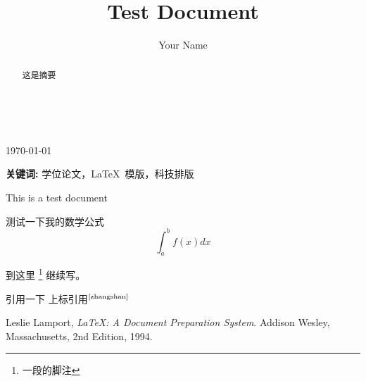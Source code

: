 \documentclass[a4paper,11pt,twoside,openany]{article}
\newcommand{\upcite}[1]{$^{\mbox{\scriptsize \cite{#1}}}$}%
\begin{document}
\tableofcontents
\thispagestyle{empty} 　　　%
\author{Your Name}
\title{Test Document}
\maketitle
\today %
\begin{abstract}
这是摘要
\end{abstract}
\vfill %
\textbf{关键词:} 学位论文，\LaTeX\ 模版，科技排版


This is a test document
\newline %

测试一下我的数学公式\[\int_a^b f(x)dx\]

到这里
\footnote{一段的脚注}
继续写。
\par
引用一下\cite{zhangshan}
上标引用\upcite{zhangshan}
\par

\begin{thebibliography}{9}
Leslie Lamport,
\emph{\LaTeX: A Document Preparation System}.
Addison Wesley, Massachusetts,
2nd Edition,
1994.
\end{thebibliography}
\end{document}
